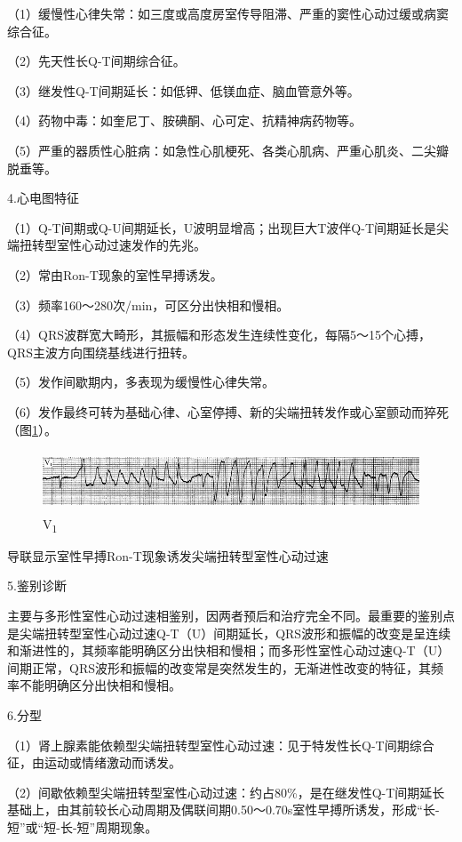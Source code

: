 （1）缓慢性心律失常：如三度或高度房室传导阻滞、严重的窦性心动过缓或病窦综合征。

（2）先天性长Q-T间期综合征。

（3）继发性Q-T间期延长：如低钾、低镁血症、脑血管意外等。

（4）药物中毒：如奎尼丁、胺碘酮、心可定、抗精神病药物等。

（5）严重的器质性心脏病：如急性心肌梗死、各类心肌病、严重心肌炎、二尖瓣脱垂等。

4.心电图特征

（1）Q-T间期或Q-U间期延长，U波明显增高；出现巨大T波伴Q-T间期延长是尖端扭转型室性心动过速发作的先兆。

（2）常由Ron-T现象的室性早搏诱发。

（3）频率160～280次/min，可区分出快相和慢相。

（4）QRS波群宽大畸形，其振幅和形态发生连续性变化，每隔5～15个心搏，QRS主波方向围绕基线进行扭转。

（5）发作间歇期内，多表现为缓慢性心律失常。

（6）发作最终可转为基础心律、心室停搏、新的尖端扭转发作或心室颤动而猝死（图\ref{fig39-11}）。

\begin{figure}[!htbp]
 \centering
 \includegraphics[width=5.58333in,height=0.70833in]{./images/Image00660.jpg}
 \captionsetup{justification=centering}
 \caption{V\textsubscript{1}}
 \label{fig39-11}
  \end{figure} 
导联显示室性早搏Ron-T现象诱发尖端扭转型室性心动过速

5.鉴别诊断

主要与多形性室性心动过速相鉴别，因两者预后和治疗完全不同。最重要的鉴别点是尖端扭转型室性心动过速Q-T（U）间期延长，QRS波形和振幅的改变是呈连续和渐进性的，其频率能明确区分出快相和慢相；而多形性室性心动过速Q-T（U）间期正常，QRS波形和振幅的改变常是突然发生的，无渐进性改变的特征，其频率不能明确区分出快相和慢相。

6.分型

（1）肾上腺素能依赖型尖端扭转型室性心动过速：见于特发性长Q-T间期综合征，由运动或情绪激动而诱发。

（2）间歇依赖型尖端扭转型室性心动过速：约占80\%，是在继发性Q-T间期延长基础上，由其前较长心动周期及偶联间期0.50～0.70s室性早搏所诱发，形成“长-短”或“短-长-短”周期现象。

